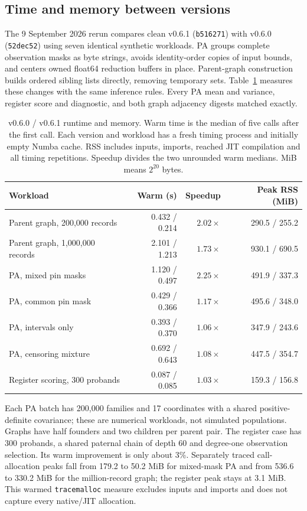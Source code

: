 \subsection{Time and memory between versions}
\label{sec:time-memory}

The 9 September 2026 rerun compares clean v0.6.1 (\texttt{b516271}) with
v0.6.0 (\texttt{52dec52}) using seven identical synthetic workloads.
PA groups complete observation masks as byte strings, avoids identity-order
copies of input bounds, and centers owned float64 reduction buffers in place.
Parent-graph construction builds ordered sibling lists directly, removing
temporary sets. Table~\ref{tab:time-memory} measures these changes with the
same inference rules. Every PA mean and variance, register score and diagnostic,
and both graph adjacency digests matched exactly.

\begin{table}[ht]
\centering
\caption{v0.6.0 / v0.6.1 runtime and memory. Warm time is the median of five
calls after the first call. Each version and workload has a fresh timing
process and initially empty Numba cache. RSS includes inputs, imports, reached
JIT compilation and all timing repetitions. Speedup divides the two unrounded
warm medians. MiB means $2^{20}$ bytes.}
\label{tab:time-memory}
\small
\begin{tabular}{@{}lrrr@{}}
\toprule
Workload & Warm (s) & Speedup & Peak RSS (MiB) \\
\midrule
Parent graph, 200,000 records & 0.432 / 0.214 & $2.02\times$ & 290.5 / 255.2 \\
Parent graph, 1,000,000 records & 2.101 / 1.213 & $1.73\times$ & 930.1 / 690.5 \\
PA, mixed pin masks & 1.120 / 0.497 & $2.25\times$ & 491.9 / 337.3 \\
PA, common pin mask & 0.429 / 0.366 & $1.17\times$ & 495.6 / 348.0 \\
PA, intervals only & 0.393 / 0.370 & $1.06\times$ & 347.9 / 243.6 \\
PA, censoring mixture & 0.692 / 0.643 & $1.08\times$ & 447.5 / 354.7 \\
Register scoring, 300 probands & 0.087 / 0.085 & $1.03\times$ & 159.3 / 156.8 \\
\bottomrule
\end{tabular}
\end{table}

Each PA batch has 200,000 families and 17 coordinates with a shared
positive-definite covariance; these are numerical workloads, not simulated
populations. Graphs have half founders and two children per parent pair.
The register case has 300 probands, a shared paternal chain of depth 60 and
degree-one observation selection. Its warm improvement is only about 3\%.
Separately traced call-allocation peaks fall from 179.2 to 50.2 MiB for
mixed-mask PA and from 536.6 to 330.2 MiB for the million-record graph;
the register peak stays at 3.1 MiB. This warmed \texttt{tracemalloc} measure
excludes inputs and imports and does not capture every native/JIT allocation.


